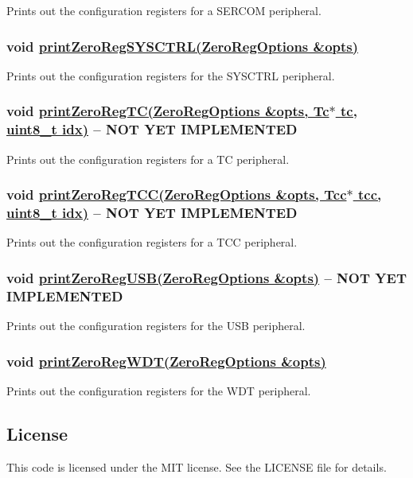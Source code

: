 Prints out the configuration registers for a {\ttfamily S\+E\+R\+C\+OM} peripheral.

\subsubsection*{void \hyperlink{_zero_regs_8h_a7b606cb3f1144532412356243668c1ce}{print\+Zero\+Reg\+S\+Y\+S\+C\+T\+R\+L(\+Zero\+Reg\+Options \&opts)}}

Prints out the configuration registers for the {\ttfamily S\+Y\+S\+C\+T\+RL} peripheral.

\subsubsection*{void \hyperlink{_zero_regs_8h_a0f776ca1e5a274dd72257e015eba2f98}{print\+Zero\+Reg\+T\+C(\+Zero\+Reg\+Options \&opts, Tc$\ast$ tc, uint8\+\_\+t idx)} -- {\bfseries N\+OT Y\+ET I\+M\+P\+L\+E\+M\+E\+N\+T\+ED}}

Prints out the configuration registers for a {\ttfamily TC} peripheral.

\subsubsection*{void \hyperlink{_zero_regs_8h_acdcf41658b0d0b0747a170019743e2b8}{print\+Zero\+Reg\+T\+C\+C(\+Zero\+Reg\+Options \&opts, Tcc$\ast$ tcc, uint8\+\_\+t idx)} -- {\bfseries N\+OT Y\+ET I\+M\+P\+L\+E\+M\+E\+N\+T\+ED}}

Prints out the configuration registers for a {\ttfamily T\+CC} peripheral.

\subsubsection*{void \hyperlink{_zero_regs_8h_a0f50e185fe18ba9749b55a6d7ac781f1}{print\+Zero\+Reg\+U\+S\+B(\+Zero\+Reg\+Options \&opts)} -- {\bfseries N\+OT Y\+ET I\+M\+P\+L\+E\+M\+E\+N\+T\+ED}}

Prints out the configuration registers for the {\ttfamily U\+SB} peripheral.

\subsubsection*{void \hyperlink{_zero_regs_8h_a8dd36048a3979014ebb8d385046c91e1}{print\+Zero\+Reg\+W\+D\+T(\+Zero\+Reg\+Options \&opts)}}

Prints out the configuration registers for the {\ttfamily W\+DT} peripheral.

\subsection*{License }

This code is licensed under the M\+IT license. See the {\ttfamily L\+I\+C\+E\+N\+SE} file for details. 